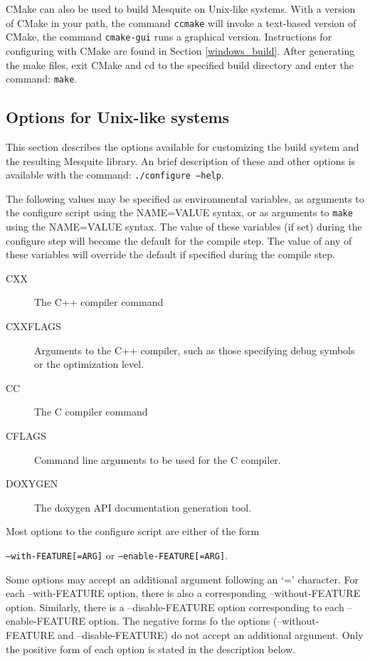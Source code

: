 CMake can also be used to build Mesquite on Unix-like systems.  With a version of CMake in your path, the command \texttt{ccmake} will invoke a text-based version of CMake, the command \texttt{cmake-gui} runs a graphical version. Instructions for configuring with CMake are found in Section \ref{windows_build}.  After generating the make files, exit CMake and cd to the specified build directory and enter the command: \texttt{make}.  

\subsection{Options for Unix-like systems}
\label{build_options}
This section describes the options available for customizing the build
system and the resulting Mesquite library.  An brief description of these
and other options is available with the command: \texttt{./configure --help}.

\label{mes_vars_and_defs}
The following values may be specified as environmental variables, as arguments
to the configure script using the NAME=VALUE syntax, or as arguments to \texttt{make}
using the NAME=VALUE syntax.  The value of these variables (if set) during the
configure step will become the default for the compile step.  The value of any
of these variables will override the default if specified during the compile
step.
\begin{description}
\item[CXX]       The C++ compiler command
\item[CXXFLAGS]  Arguments to the C++ compiler, such as those specifying 
debug symbols or the optimization level.
\item[CC]        The C compiler command
\item[CFLAGS]    Command line arguments to be used for the C compiler.
\item[DOXYGEN]   The doxygen API documentation generation tool.
\end{description}

Most options to the configure script are either of the form 
\begin{center}
\texttt{--with-FEATURE[=ARG]} or \texttt{--enable-FEATURE[=ARG]}.
\end{center}
Some options may accept an additional argument following 
an `=' character.  For each --with-FEATURE option, there is also a corresponding
--without-FEATURE option.  Similarly, there is a --disable-FEATURE option 
corresponding to each --enable-FEATURE option.  The negative forms fo the options 
(--without-FEATURE and --disable-FEATURE) do not accept an additional argument.  
Only the positive form of each option is stated in the description below.  

